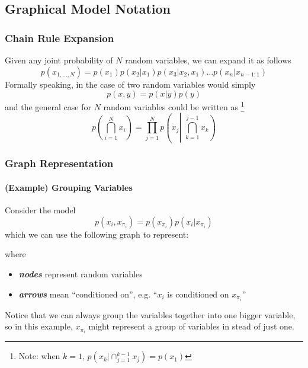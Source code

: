 \documentclass[11pt]{article}
\begin{document}
\subsection{Graphical Model Notation}
\subsubsection{Chain Rule Expansion} Given any joint probability of $N$ random variables, we can expand it as follows
\begin{equation*}
    p\left(x_{1, \ldots, N}\right)=p\left(x_{1}\right) p\left(x_{2} | x_{1}\right) p\left(x_{3} | x_{2}, x_{1}\right) \ldots p\left(x_{n} | x_{n-1: 1}\right)
\end{equation*}
Formally speaking, in the case of two random variables would simply
\begin{equation*}
    p(x, y)=p(x | y) p(y)
\end{equation*}
and the general case for $N$ random variables could be written as
\footnote{Note: when $k = 1$, $p\left(x_{k} | \cap_{j=1}^{k-1} x_{j}\right) = p(x_1)$}
\begin{equation*}
    p\left(\bigcap_{i=1}^{N} x_{i}\right)
    = \prod_{j=1}^{N} p\left(x_{j} \left\vert\,\, \bigcap_{k=1}^{j-1} x_{k}\right)\right.
\end{equation*}

\subsubsection{Graph Representation} 
\paragraph{(Example) Grouping Variables} Consider the model
\begin{equation*}
    p\left(x_{i}, x_{\pi_{i}}\right)=p\left(x_{\pi_{i}}\right) p\left(x_{i} | x_{\pi_{i}}\right)
\end{equation*}
which we can use the following graph to represent:
\begin{center}
\end{center}
where
\begin{itemize}
    \item \textit{\textbf{nodes}} represent random variables
    \item \textit{\textbf{arrows}} mean ``conditioned on'', e.g. ``$x_i$ is conditioned on $x_{\pi_i}$''
\end{itemize}
Notice that we can always group the variables together into one bigger variable, so in this example, $x_{\pi_i}$ might represent a group of variables in stead of just one. 
\end{document}
